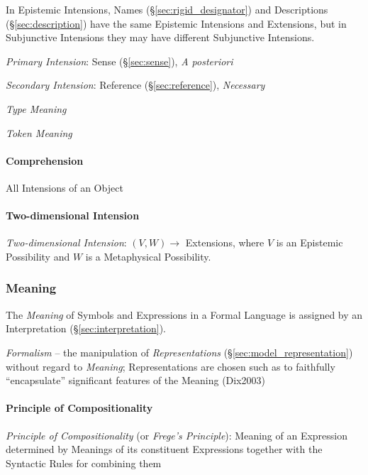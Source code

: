 In Epistemic Intensions, Names (\S\ref{sec:rigid_designator}) and Descriptions
(\S\ref{sec:description}) have the same Epistemic Intensions and Extensions, but
in Subjunctive Intensions they may have different Subjunctive Intensions.

\emph{Primary Intension}: Sense (\S\ref{sec:sense}), \emph{A
  posteriori}

\emph{Secondary Intension}: Reference (\S\ref{sec:reference}),
\emph{Necessary}

\emph{Type Meaning}

\emph{Token Meaning}



\paragraph{Comprehension}\label{sec:comprehension}\hfill

All Intensions of an Object



\paragraph{Two-dimensional Intension}\label{sec:twodimensional_intension}\hfill

\emph{Two-dimensional Intension}: $(V,W) \rightarrow$ Extensions,
where $V$ is an Epistemic Possibility and $W$ is a Metaphysical
Possibility.



\subsubsection{Meaning}\label{sec:meaning}

The \emph{Meaning} of Symbols and Expressions in a Formal Language is
assigned by an Interpretation (\S\ref{sec:interpretation}).

\emph{Formalism} -- the manipulation of \emph{Representations}
(\S\ref{sec:model_representation}) without regard to \emph{Meaning};
Representations are chosen such as to faithfully ``encapsulate'' significant
features of the Meaning (Dix2003)



\paragraph{Principle of Compositionality}\label{sec:compositionality}
\hfill

\emph{Principle of Compositionality} (or \emph{Frege's Principle}):
Meaning of an Expression determined by Meanings of its constituent
Expressions together with the Syntactic Rules for combining them

